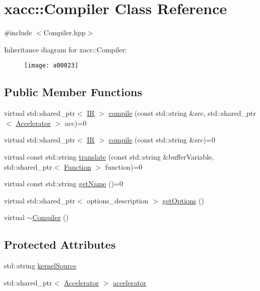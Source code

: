 \hypertarget{a00023}{}\section{xacc\+:\+:Compiler Class Reference}
\label{a00023}


{\ttfamily \#include $<$Compiler.\+hpp$>$}

Inheritance diagram for xacc\+:\+:Compiler\+:\begin{figure}[H]
\begin{center}
\leavevmode
\texttt{[image: a00023]}
\end{center}
\end{figure}
\subsection*{Public Member Functions}
\begin{DoxyCompactItemize}
\item 
virtual std\+::shared\+\_\+ptr$<$ \hyperlink{a00050}{IR} $>$ \hyperlink{a00023_a546a40c95bb93af6a0c0ac48dbeaffc8}{compile} (const std\+::string \&src, std\+::shared\+\_\+ptr$<$ \hyperlink{a00011}{Accelerator} $>$ acc)=0
\item 
virtual std\+::shared\+\_\+ptr$<$ \hyperlink{a00050}{IR} $>$ \hyperlink{a00023_a9092f5f779b570c91569b59621280c04}{compile} (const std\+::string \&src)=0
\item 
virtual const std\+::string \hyperlink{a00023_aeedbe58a33fed29e4d7694ae743e25e7}{translate} (const std\+::string \&buffer\+Variable, std\+::shared\+\_\+ptr$<$ \hyperlink{a00038}{Function} $>$ function)=0
\item 
virtual const std\+::string \hyperlink{a00023_a87fca9100e6462122f5b687c3a0fb3fb}{get\+Name} ()=0
\item 
virtual std\+::shared\+\_\+ptr$<$ options\+\_\+description $>$ \hyperlink{a00023_a9f5a8965c9c2dd895016d18264ebbe92}{get\+Options} ()
\item 
virtual \hyperlink{a00023_a5d0b012687d9b44893872eaa81e47b38}{$\sim$\+Compiler} ()
\end{DoxyCompactItemize}
\subsection*{Protected Attributes}
\begin{DoxyCompactItemize}
\item 
std\+::string \hyperlink{a00023_a0ad81c816c09e5113d03cdc02165c453}{kernel\+Source}
\item 
std\+::shared\+\_\+ptr$<$ \hyperlink{a00011}{Accelerator} $>$ \hyperlink{a00023_ad4cbb467fa7e377bac6c054ffcb22b7c}{accelerator}
\end{DoxyCompactItemize}


